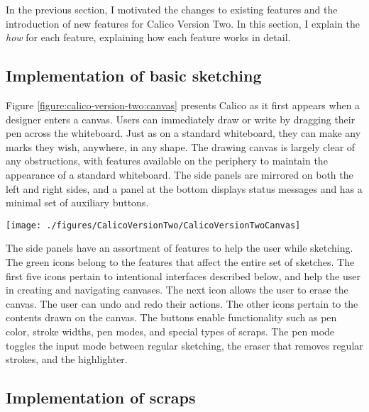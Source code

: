 In the previous section, I motivated the changes to existing features and the introduction of new features for Calico Version Two. In this section, I explain the \emph{how} for each feature, explaining how each feature works in detail.

\subsection{Implementation of basic sketching}

Figure \ref{figure:calico-version-two:canvas} presents Calico as it first appears when a designer enters a canvas. Users can immediately draw or write by dragging their pen across the whiteboard. Just as on a standard whiteboard, they can make any marks they wish, anywhere, in any shape. The drawing canvas is largely clear of any obstructions, with features available on the periphery to maintain the appearance of a standard whiteboard. The side panels are mirrored on both the left and right sides, and a panel at the bottom displays status messages and has a minimal set of auxiliary buttons. 

\begin{figure*}[tbh]
  \centering
  \texttt{[image: ./figures/CalicoVersionTwo/CalicoVersionTwoCanvas]}
  \caption{The Calico canvas interface, including the side panels and the drawing space.}
  \label{figure:calico-version-two:canvas}
\end{figure*}

The side panels have an assortment of features to help the user while sketching. The green icons belong to the features that affect the entire set of sketches. The first five icons pertain to intentional interfaces described below, and help the user in creating and navigating canvases. The next icon allows the user to erase the canvas. The user can undo and redo their actions. The other icons pertain to the contents drawn on the canvas. The buttons enable functionality such as pen color, stroke widths, pen modes, and special types of scraps. The pen mode toggles the input mode between regular sketching, the eraser that removes regular strokes, and the highlighter.  

\subsection{Implementation of scraps}

